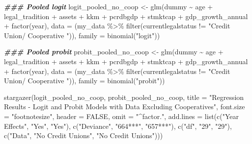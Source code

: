 \documentclass[a4paper,nobind]{templates/ociamthesis}
\newenvironment{Shaded}{\begin{snugshade}}{\end{snugshade}}
\newcommand{\AttributeTok}[1]{\textcolor[rgb]{0.77,0.63,0.00}{#1}}
\newcommand{\ConstantTok}[1]{\textcolor[rgb]{0.00,0.00,0.00}{#1}}
\newcommand{\DocumentationTok}[1]{\textcolor[rgb]{0.56,0.35,0.01}{\textbf{\textit{#1}}}}
\newcommand{\FunctionTok}[1]{\textcolor[rgb]{0.00,0.00,0.00}{#1}}
\newcommand{\NormalTok}[1]{#1}
\newcommand{\OtherTok}[1]{\textcolor[rgb]{0.56,0.35,0.01}{#1}}
\newcommand{\SpecialCharTok}[1]{\textcolor[rgb]{0.00,0.00,0.00}{#1}}
\newcommand{\StringTok}[1]{\textcolor[rgb]{0.31,0.60,0.02}{#1}}
\renewenvironment{Shaded}
{
  \vspace{10pt}%
  \begin{snugshade}%
}{%
  \end{snugshade}%
  \vspace{8pt}%
}
\begin{document}
\begin{Shaded}
\begin{Highlighting}[]
\DocumentationTok{\#\#\# Pooled logit}
\NormalTok{logit\_pooled\_no\_coop }\OtherTok{\textless{}{-}} \FunctionTok{glm}\NormalTok{(dummy }\SpecialCharTok{\textasciitilde{}}\NormalTok{ age }\SpecialCharTok{+}\NormalTok{ legal\_tradition }\SpecialCharTok{+} 
\NormalTok{       assets }\SpecialCharTok{+}\NormalTok{ kkm }\SpecialCharTok{+} 
\NormalTok{       pcrdbgdp }\SpecialCharTok{+}\NormalTok{ stmktcap }\SpecialCharTok{+}\NormalTok{ gdp\_growth\_annual }\SpecialCharTok{+} \FunctionTok{factor}\NormalTok{(year), }
       \AttributeTok{data =}\NormalTok{ (my\_data }\SpecialCharTok{\%\textgreater{}\%} \FunctionTok{filter}\NormalTok{(currentlegalstatus }\SpecialCharTok{!=} \StringTok{"Credit Union/ Cooperative "}\NormalTok{)), }\AttributeTok{family =} \FunctionTok{binomial}\NormalTok{(}\StringTok{"logit"}\NormalTok{))}

\DocumentationTok{\#\#\# Pooled probit}
\NormalTok{probit\_pooled\_no\_coop }\OtherTok{\textless{}{-}} \FunctionTok{glm}\NormalTok{(dummy }\SpecialCharTok{\textasciitilde{}}\NormalTok{ age }\SpecialCharTok{+}\NormalTok{ legal\_tradition }\SpecialCharTok{+} 
\NormalTok{       assets }\SpecialCharTok{+}\NormalTok{ kkm }\SpecialCharTok{+} 
\NormalTok{       pcrdbgdp }\SpecialCharTok{+}\NormalTok{ stmktcap }\SpecialCharTok{+}\NormalTok{ gdp\_growth\_annual }\SpecialCharTok{+} \FunctionTok{factor}\NormalTok{(year), }
       \AttributeTok{data =}\NormalTok{ (my\_data }\SpecialCharTok{\%\textgreater{}\%} \FunctionTok{filter}\NormalTok{(currentlegalstatus }\SpecialCharTok{!=} \StringTok{"Credit Union/ Cooperative "}\NormalTok{)), }\AttributeTok{family =} \FunctionTok{binomial}\NormalTok{(}\StringTok{"probit"}\NormalTok{))}

\FunctionTok{stargazer}\NormalTok{(logit\_pooled\_no\_coop, probit\_pooled\_no\_coop, }\AttributeTok{title =} \StringTok{"Regression Results {-} Logit and Probit Models with Data Excluding Cooperatives"}\NormalTok{, }\AttributeTok{font.size =} \StringTok{"footnotesize"}\NormalTok{, }\AttributeTok{header =} \ConstantTok{FALSE}\NormalTok{, }\AttributeTok{omit =} \StringTok{"\^{}factor."}\NormalTok{, }\AttributeTok{add.lines =} \FunctionTok{list}\NormalTok{(}\FunctionTok{c}\NormalTok{(}\StringTok{"Year Effects"}\NormalTok{, }\StringTok{"Yes"}\NormalTok{, }\StringTok{"Yes"}\NormalTok{),                      }
\FunctionTok{c}\NormalTok{(}\StringTok{"Deviance"}\NormalTok{, }\StringTok{"664***"}\NormalTok{, }\StringTok{"657***"}\NormalTok{), }\FunctionTok{c}\NormalTok{(}\StringTok{"df"}\NormalTok{, }\StringTok{"29"}\NormalTok{, }\StringTok{"29"}\NormalTok{), }\FunctionTok{c}\NormalTok{(}\StringTok{"Data"}\NormalTok{, }\StringTok{"No Credit Unions"}\NormalTok{, }\StringTok{"No Credit Unions"}\NormalTok{)))}
\end{Highlighting}
\end{Shaded}
\end{document}
